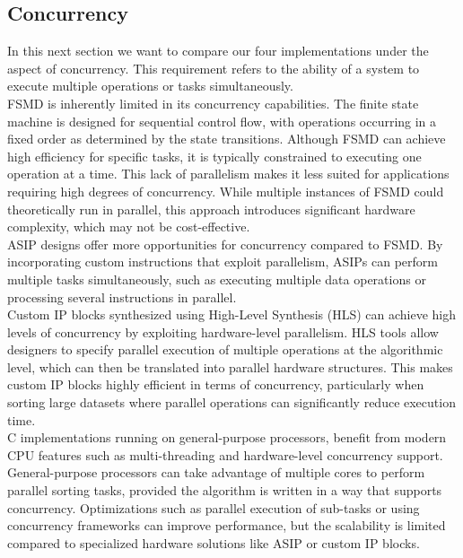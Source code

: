 \documentclass[conference]{IEEEtran}
\begin{document}
\subsection{Concurrency}
In this next section we want to compare our four implementations under the aspect of concurrency. This requirement refers to the ability of a system to execute multiple operations or tasks simultaneously.\\
FSMD is inherently limited in its concurrency capabilities. The finite state machine is designed for sequential control flow, with operations occurring in a fixed order as determined by the state transitions. Although FSMD can achieve high efficiency for specific tasks, it is typically constrained to executing one operation at a time. This lack of parallelism makes it less suited for applications requiring high degrees of concurrency. While multiple instances of FSMD could theoretically run in parallel, this approach introduces significant hardware complexity, which may not be cost-effective.\\
ASIP designs offer more opportunities for concurrency compared to FSMD. By incorporating custom instructions that exploit parallelism, ASIPs can perform multiple tasks simultaneously, such as executing multiple data operations or processing several instructions in parallel.\\
Custom IP blocks synthesized using High-Level Synthesis (HLS) can achieve high levels of concurrency by exploiting hardware-level parallelism. HLS tools allow designers to specify parallel execution of multiple operations at the algorithmic level, which can then be translated into parallel hardware structures. This makes custom IP blocks highly efficient in terms of concurrency, particularly when sorting large datasets where parallel operations can significantly reduce execution time.\\
C implementations running on general-purpose processors, benefit from modern CPU features such as multi-threading and hardware-level concurrency support. General-purpose processors can take advantage of multiple cores to perform parallel sorting tasks, provided the algorithm is written in a way that supports concurrency. Optimizations such as parallel execution of sub-tasks or using concurrency frameworks can improve performance, but the scalability is limited compared to specialized hardware solutions like ASIP or custom IP blocks.\\
\end{document}
